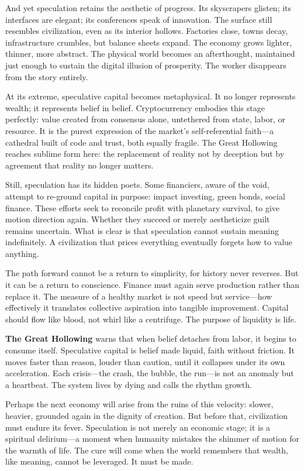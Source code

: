 \documentclass[11pt,twoside]{book}
\begin{document}
And yet speculation retains the aesthetic of progress.  Its skyscrapers glisten; its interfaces are elegant; its conferences speak of innovation.  The surface still resembles civilization, even as its interior hollows.  Factories close, towns decay, infrastructure crumbles, but balance sheets expand.  The economy grows lighter, thinner, more abstract.  The physical world becomes an afterthought, maintained just enough to sustain the digital illusion of prosperity.  The worker disappears from the story entirely.

At its extreme, speculative capital becomes metaphysical.  It no longer represents wealth; it represents belief in belief.  Cryptocurrency embodies this stage perfectly: value created from consensus alone, untethered from state, labor, or resource.  It is the purest expression of the market’s self-referential faith—a cathedral built of code and trust, both equally fragile.  The Great Hollowing reaches sublime form here: the replacement of reality not by deception but by agreement that reality no longer matters.

Still, speculation has its hidden poets.  Some financiers, aware of the void, attempt to re-ground capital in purpose: impact investing, green bonds, social finance.  These efforts seek to reconcile profit with planetary survival, to give motion direction again.  Whether they succeed or merely aestheticize guilt remains uncertain.  What is clear is that speculation cannot sustain meaning indefinitely.  A civilization that prices everything eventually forgets how to value anything.

The path forward cannot be a return to simplicity, for history never reverses.  But it can be a return to conscience.  Finance must again serve production rather than replace it.  The measure of a healthy market is not speed but service—how effectively it translates collective aspiration into tangible improvement.  Capital should flow like blood, not whirl like a centrifuge.  The purpose of liquidity is life.

\textbf{The Great Hollowing} warns that when belief detaches from labor, it begins to consume itself.  Speculative capital is belief made liquid, faith without friction.  It moves faster than reason, louder than caution, until it collapses under its own acceleration.  Each crisis—the crash, the bubble, the run—is not an anomaly but a heartbeat.  The system lives by dying and calls the rhythm growth.

Perhaps the next economy will arise from the ruins of this velocity: slower, heavier, grounded again in the dignity of creation.  But before that, civilization must endure its fever.  Speculation is not merely an economic stage; it is a spiritual delirium—a moment when humanity mistakes the shimmer of motion for the warmth of life.  The cure will come when the world remembers that wealth, like meaning, cannot be leveraged.  It must be made.
\end{document}
